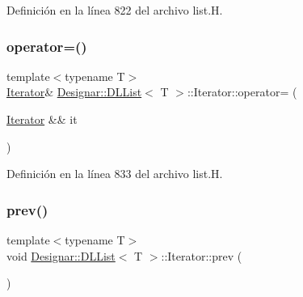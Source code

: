 Definición en la línea 822 del archivo list.\+H.

\mbox{\label{class_designar_1_1_d_l_list_1_1_iterator_a92bdff852753fecd794b5691419858a8}} 
\subsubsection{\texorpdfstring{operator=()}{operator=()}\hspace{0.1cm}{\footnotesize\ttfamily [2/2]}}
{\footnotesize\ttfamily template$<$typename T$>$ \\
\hyperlink{class_designar_1_1_d_l_list_1_1_iterator}{Iterator}\& \hyperlink{class_designar_1_1_d_l_list}{Designar\+::\+D\+L\+List}$<$ T $>$\+::Iterator\+::operator= (\begin{DoxyParamCaption}\item[{\hyperlink{class_designar_1_1_d_l_list_1_1_iterator}{Iterator} \&\&}]{it }\end{DoxyParamCaption})\hspace{0.3cm}{\ttfamily [inline]}}



Definición en la línea 833 del archivo list.\+H.

\mbox{\label{class_designar_1_1_d_l_list_1_1_iterator_ac713eeea83e3e32a939067614a13c41d}} 
\subsubsection{\texorpdfstring{prev()}{prev()}}
{\footnotesize\ttfamily template$<$typename T$>$ \\
void \hyperlink{class_designar_1_1_d_l_list}{Designar\+::\+D\+L\+List}$<$ T $>$\+::Iterator\+::prev (\begin{DoxyParamCaption}{ }\end{DoxyParamCaption})\hspace{0.3cm}{\ttfamily [inline]}}




